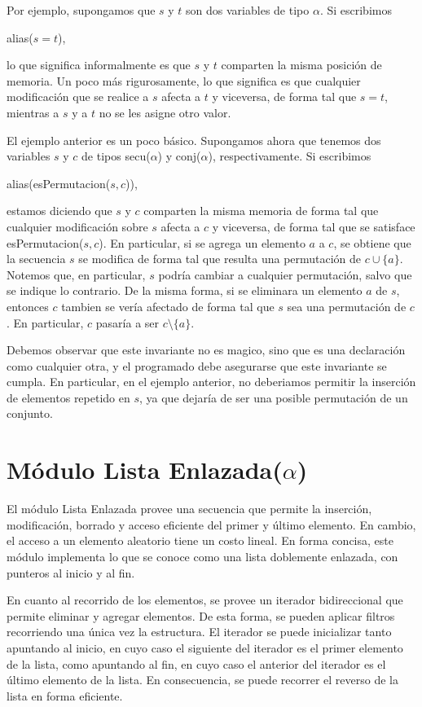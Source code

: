 \documentclass[a4paper,10pt]{article}
\begin{document}
Por ejemplo, supongamos que $s$ y $t$ son dos variables de tipo $\alpha$.  Si escribimos
\begin{center}
  alias($s = t$),
\end{center}
lo que significa informalmente es que $s$ y $t$ comparten la misma posición de memoria.  Un poco más rigurosamente, lo que significa es que cualquier modificación que se realice a $s$ afecta a $t$ y viceversa, de forma tal que $s = t$, mientras a $s$ y a $t$ no se les asigne otro valor.

El ejemplo anterior es un poco básico.  Supongamos ahora que tenemos dos variables $s$ y $c$ de tipos secu($\alpha$) y conj($\alpha$), respectivamente.  Si escribimos
\begin{center}
  alias(esPermutacion($s, c$)),
\end{center}
estamos diciendo que $s$ y $c$ comparten la misma memoria de forma tal que cualquier modificación sobre $s$ afecta a $c$ y viceversa, de forma tal que se satisface esPermutacion($s, c$).  En particular, si se agrega un elemento $a$ a $c$, se obtiene que la secuencia $s$ se modifica de forma tal que resulta una permutación de $c \cup \{a\}$.  Notemos que, en particular, $s$ podría cambiar a cualquier permutación, salvo que se indique lo contrario.  De la misma forma, si se eliminara un elemento $a$ de $s$, entonces $c$ tambien se vería afectado de forma tal que $s$ sea una permutación de $c$.  En particular, $c$ pasaría a ser $c \setminus \{a\}$.

Debemos observar que este invariante no es magico, sino que es una declaración como cualquier otra, y el programado debe asegurarse que este invariante se cumpla.  En particular, en el ejemplo anterior, no deberiamos permitir la inserción de elementos repetido en $s$, ya que dejaría de ser una posible permutación de un conjunto.

\section{Módulo Lista Enlazada($\alpha$)}

El módulo Lista Enlazada provee una secuencia que permite la inserción, modificación, borrado y acceso eficiente del primer y último elemento.  En cambio, el acceso a un elemento aleatorio tiene un costo lineal.  En forma concisa, este módulo implementa lo que se conoce como una lista doblemente enlazada, con punteros al inicio y al fin.

En cuanto al recorrido de los elementos, se provee un iterador bidireccional que permite eliminar y agregar elementos.  De esta forma, se pueden aplicar filtros recorriendo una única vez la estructura.  El iterador se puede inicializar tanto apuntando al inicio, en cuyo caso el siguiente del iterador es el primer elemento de la lista, como apuntando al fin, en cuyo caso el anterior del iterador es el último elemento de la lista.  En consecuencia, se puede recorrer el reverso de la lista en forma eficiente.
\end{document}
